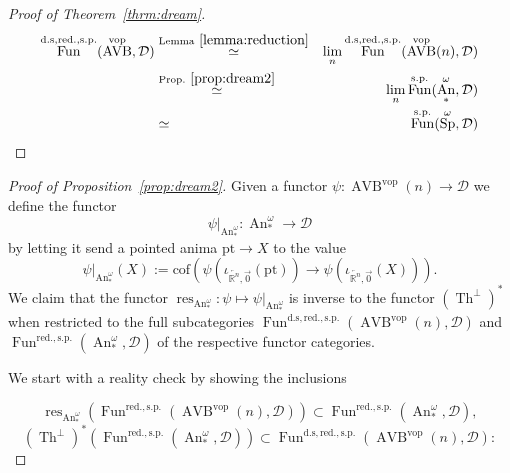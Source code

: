 \documentclass{article}
\newcommand{\R}{\mathbb{R}} %
\newcommand{\cD}{\mathcal{D}}
\newcommand{\pt}{\mathrm{pt}}
\newcommand{\vop}{\mathrm{vop}}
\newcommand{\iotarnzero}{\iota_{\overleftarrow{\R^n},\overrightarrow{0}}}
\DeclareMathOperator{\AVB}{AVB}
\DeclareMathOperator{\An}{An}
\DeclareMathOperator{\Sp}{Sp}
\DeclareMathOperator{\Fun}{Fun}
\DeclareMathOperator{\res}{res}
\DeclareMathOperator{\Th}{Th}
\begin{document}
\begin{proof}[Proof of Theorem~\ref{thrm:dream}]
    \begin{eqnarray*}   
        \Fun^{\mathrm{d.s,red.,s.p.}}(\AVB^\vop, \mathcal D) & \stackrel{\mathrm{Lemma}~\ref{lemma:reduction}}{\simeq} & \lim_n 
        \Fun^{\mathrm{d.s,red.,s.p.}}(\AVB^\vop(n), \mathcal D) \\
        & \stackrel{\mathrm{Prop.}~\ref{prop:dream2}}{\simeq} & \lim_n \Fun^{\mathrm{s.p.}}(\An_*^\omega, \mathcal D) \\
        & \simeq & \Fun^{\mathrm{s.p.}}(\Sp^\omega, \mathcal D)
    \end{eqnarray*} 
\end{proof}
\begin{proof}[Proof of Proposition~\ref{prop:dream2}]
    Given a functor $\psi \colon \AVB^\vop(n) \to \mathcal D$ we define 
    the functor 
    \[
    \psi|_{\An_*^\omega} \colon \An_*^\omega \to \mathcal D    
    \]
    by letting it send a pointed anima $\pt \to X$ to the value 
    \[
    \psi|_{\An_*^\omega}(X) := \mathrm{cof}\left( \psi(\iotarnzero(\pt))\to \psi(\iotarnzero(X))\right).  
    \]
    We claim that the functor $\res_{\An_*^\omega} \colon \psi \mapsto \psi|_{\An_*^\omega}$ is inverse to the functor $(\Th^\perp)^*$ when restricted to 
    the full subcategories 
    $\Fun^{\mathrm{d.s,red.,s.p.}}(\AVB^\vop(n), \mathcal D)$ and 
    $\Fun^{\mathrm{red.,s.p.}}(\An_*^\omega, \cD)$ of the respective functor categories.

    We start with a reality check by showing the inclusions 
    
        \[ 
            \res_{\An_*^\omega}(\Fun^{\mathrm{red.,s.p.}}(\AVB^\vop(n), \mathcal D)) \subset \Fun^{\mathrm{red.,s.p.}}(\An_*^\omega, \cD),
        \]
         \[
            (\Th^\perp)^*(\Fun^{\mathrm{red.,s.p.}}(\An_*^\omega, \cD)) \subset \Fun^{\mathrm{d.s,red.,s.p.}}(\AVB^\vop(n), \mathcal D):
        \]



\end{proof}
\end{document}
